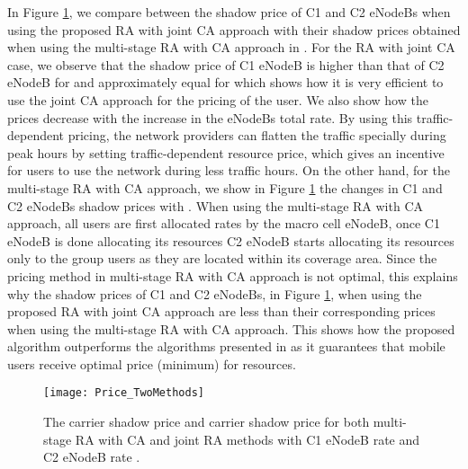 \documentclass[journal]{IEEEtran} 		\usepackage{amsmath,amssymb}
\begin{document}
In Figure \ref{fig:Price_TwoMethods}, we compare between the shadow price of C1 and C2 eNodeBs when using the proposed RA with joint CA approach with their shadow prices obtained when using the multi-stage RA with CA approach in \cite{Haya_Utility1,Haya_Utility3,Haya_Utility6}. For the RA with joint CA case, we observe that the shadow price of C1 eNodeB is higher than that of C2 eNodeB for  and approximately equal for  which shows how it is very efficient to use the joint CA approach for the pricing of the user. We also show how the prices decrease with the increase in the eNodeBs total rate. By using this traffic-dependent pricing, the network providers can flatten the traffic specially during peak hours by setting traffic-dependent resource price, which gives an incentive for users to use the network during less traffic hours. On the other hand, for the multi-stage RA with CA approach, we show in Figure \ref{fig:Price_TwoMethods} the changes in C1 and C2 eNodeBs shadow prices
with . When using the multi-stage RA with CA approach, all users are first allocated rates by the macro cell eNodeB, once C1 eNodeB is done allocating its resources C2 eNodeB starts allocating its resources only to the  group users as they are located within its coverage area. Since the pricing method in multi-stage RA with CA approach is not optimal, this explains why the shadow prices of C1 and C2 eNodeBs, in Figure \ref{fig:Price_TwoMethods}, when using the proposed RA with joint CA approach are less than their corresponding prices when using the multi-stage RA with CA approach. This shows how the proposed algorithm outperforms the algorithms presented in \cite{Haya_Utility1,Haya_Utility3,Haya_Utility6} as it guarantees that mobile users receive optimal price (minimum) for resources.

\begin{figure}[tb]
\centering
\texttt{[image: Price\_TwoMethods]}
\caption{The  carrier shadow price  and  carrier shadow price  for both multi-stage RA with CA and joint RA methods with C1 eNodeB rate  and C2 eNodeB rate .}
\label{fig:Price_TwoMethods}
\end{figure}
\end{document}
